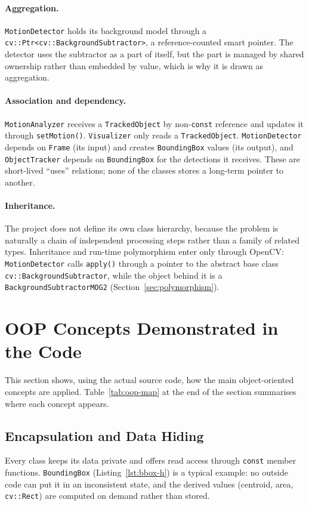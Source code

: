 \documentclass[12pt,a4paper,oneside]{book}
\begin{document}
\paragraph{Aggregation.}
\texttt{MotionDetector} holds its background model through a \texttt{cv::\allowbreak Ptr<\allowbreak cv::\allowbreak BackgroundSubtractor>}, a reference-counted smart pointer. The detector uses the subtractor as a part of itself, but the part is managed by shared ownership rather than embedded by value, which is why it is drawn as aggregation.

\paragraph{Association and dependency.}
\texttt{MotionAnalyzer} receives a \texttt{TrackedObject} by non-\texttt{const} reference and updates it through \texttt{setMotion()}. \texttt{Visualizer} only reads a \texttt{TrackedObject}. \texttt{MotionDetector} depends on \texttt{Frame} (its input) and creates \texttt{BoundingBox} values (its output), and \texttt{ObjectTracker} depends on \texttt{BoundingBox} for the detections it receives. These are short-lived ``uses'' relations; none of the classes stores a long-term pointer to another.

\paragraph{Inheritance.}
The project does not define its own class hierarchy, because the problem is naturally a chain of independent processing steps rather than a family of related types. Inheritance and run-time polymorphism enter only through OpenCV: \texttt{MotionDetector} calls \texttt{apply()} through a pointer to the abstract base class \texttt{cv::BackgroundSubtractor}, while the object behind it is a \texttt{BackgroundSubtractorMOG2} (Section~\ref{sec:polymorphism}).

\section{OOP Concepts Demonstrated in the Code}
\label{sec:oop}
This section shows, using the actual source code, how the main object-oriented concepts are applied. Table~\ref{tab:oop-map} at the end of the section summarises where each concept appears.

\subsection{Encapsulation and Data Hiding}
Every class keeps its data private and offers read access through \texttt{const} member functions. \texttt{BoundingBox} (Listing~\ref{lst:bbox-h}) is a typical example: no outside code can put it in an inconsistent state, and the derived values (centroid, area, \texttt{cv::Rect}) are computed on demand rather than stored.
\end{document}
